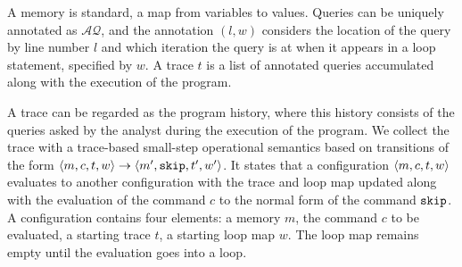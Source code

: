  A memory is standard, a map from variables to values. Queries can be uniquely annotated as $\mathcal{AQ}$, and the annotation $(l,w)$ considers the location of the query by line number $l$ and which iteration the query is at when it appears in a loop statement, specified by $w$. A trace $t$ is a list of annotated queries accumulated along with the execution of the program. 
 
A trace can be regarded as the program history, where this history consists of the queries asked by the analyst during the execution of the program. We collect the trace with a trace-based small-step operational semantics based on transitions of the form $ \langle m,c, t, w \rangle \to \langle m', \mathtt{skip}, t', w' \rangle $. It states that a configuration $\langle m, c, t,w \rangle$ evaluates to another configuration with the trace and loop map updated along with the evaluation of the command $c$ to the normal form of the command $\mathtt{skip}$.  A configuration contains four elements: a memory $m$, the command $c$ to be evaluated, a starting trace $t$, a starting loop map $w$. The loop map remains empty until the evaluation goes into a loop.    

